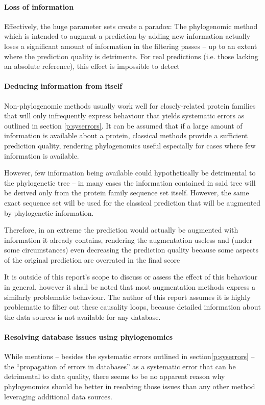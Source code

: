 \documentclass[pdftex,paper=A4,DIV=calc,titlepage,12pt]{scrartcl}
\newtheorem[L]{boxedDefinition}{Definition}
\begin{document}
\paragraph{Loss of information}
Effectively, the huge parameter sets create a paradox: The phylogenomic method which is intended to augment a prediction by adding new information actually loses a significant amount of information in the filtering passes -- up to an extent where the prediction quality is detrimente. For real predictions (i.e. those lacking an absolute reference), this effect is impossible to detect

\paragraph{Deducing information from itself}\label{p:self-deduction}
Non-phylogenomic methods usually work well for closely-related protein families that will only infrequently express behaviour that yields systematic errors as outlined in section \vref{p:syserrors}. It can be assumed that if a large amount of information is available about a protein, classical methods provide a sufficient prediction quality, rendering phylogenomics useful especially for cases where few information is available.

However, few information being available could hypothetically be detrimental to the phylogenetic tree -- in many cases the information contained in said tree will be derived only from the protein family sequence set itself. However, the same exact sequence set will be used for the classical prediction that will be augmented by phylogenetic information.

Therefore, in an extreme the prediction would actually be augmented with information it already contains, rendering the augmentation useless and (under some circumstances) even decreasing the prediction quality because some aspects of the original prediction are overrated in the final score

It is outside of this report's scope to discuss or assess the effect of this behaviour in general, however it shall be noted that most augmentation methods express a similarly problematic behaviour. The author of this report assumes it is highly problematic to filter out these causality loops, because detailed information about the data sources is not available for any database.

\paragraph{Resolving database issues using phylogenomics}
While \cite{brown2006functional} mentions -- besides the systematic errors outlined in section\vref{p:syserrors} -- the ``propagation of errors in databases'' as a systematic error that can be detrimental to data quality, there seems to be no apparent reason why phylogenomics should be better in resolving those issues than any other method leveraging additional data sources.
\end{document}
